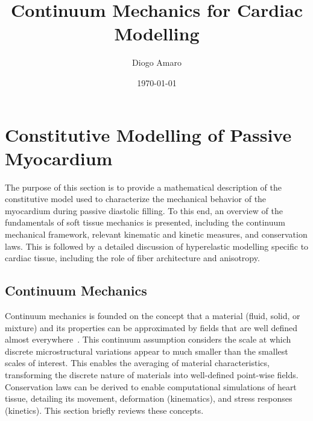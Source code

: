 \documentclass[a4paper,11pt]{article}
\title{Continuum Mechanics for Cardiac Modelling}
\author{Diogo Amaro}
\date{\today}
\begin{document}
\maketitle

\section{Constitutive Modelling of Passive Myocardium}

The purpose of this section is to provide a mathematical description of the constitutive model used to characterize the mechanical behavior of the myocardium during passive diastolic filling. To this end, an overview of the fundamentals of soft tissue mechanics is presented, including the continuum mechanical framework, relevant kinematic and kinetic measures, and conservation laws. This is followed by a detailed discussion of hyperelastic modelling specific to cardiac tissue, including the role of fiber architecture and anisotropy.


\subsection{Continuum Mechanics}
Continuum mechanics is founded on the concept that a material (ﬂuid, solid, or mixture) and its properties can be approximated by ﬁelds that are well deﬁned almost everywhere~\cite{fung1977first, gurtin1982introduction, malvern1969introduction}. This continuum assumption considers the scale at which discrete microstructural variations appear to much smaller than the smallest scales of interest. This enables the averaging of material characteristics, transforming the discrete nature of materials into well-deﬁned point-wise ﬁelds. Conservation laws can be derived to enable computational simulations of heart tissue, detailing its movement, deformation (kinematics), and stress responses (kinetics). This section briefly reviews these concepts.
\end{document}
